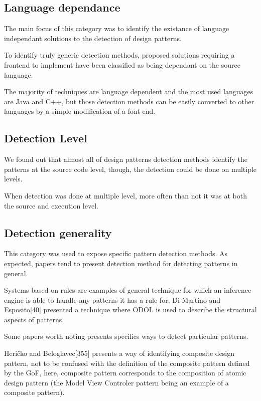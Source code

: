 \documentclass[letterpaper, 10 pt, conference]{ieeeconf}  %
\begin{document}
\subsection{Language dependance}
The main focus of this category was to identify the existance of language
independant solutions to the detection of design patterns.

To identify truly generic detection methods, proposed solutions requiring a
frontend to implement have been classified as being dependant on the source
language. 

The majority of techniques are language dependent and the most used 
languages are Java and C++, but those detection methods can be easily converted
to other languages by a simple modification of a font-end.


\subsection{Detection Level}

We found out that almost all of design patterns detection methods 
identify the patterns at the source code level, though, the detection could
be done on multiple levels.

When detection was done at multiple level, more often than not it was at both
the source and execution level.



\subsection{Detection generality}

This category was used to expose specific pattern detection methods.
As expected, papers tend to present detection method for detecting patterns
in general.

Systems based on rules are examples of general technique for which 
an inference engine is able to handle any patterns it has a rule for.
Di Martino and Esposito[40] presented a technique where ODOL is used
to describe the structural aspects of patterns.

Some papers worth noting presents specifics ways to detect particular patterns.

Heričko and Beloglavec[355] presents a way of identifying
composite design pattern, not to be confused with the definition of the 
composite pattern defined by the GoF, here, composite pattern corresponds to the
composition of atomic design pattern (the Model View Controler pattern being an
example of a composite pattern).
\end{document}
